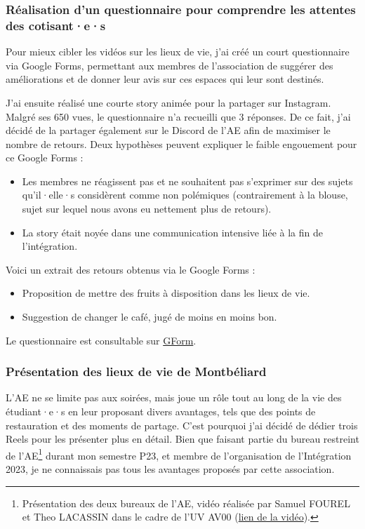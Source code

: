 \subsubsection{Réalisation d'un questionnaire pour comprendre les attentes des cotisant·e·s}

Pour mieux cibler les vidéos sur les lieux de vie, j'ai créé un court questionnaire via Google Forms, permettant aux membres de l'association de suggérer des améliorations et de donner leur avis sur ces espaces qui leur sont destinés.

J'ai ensuite réalisé une courte story animée pour la partager sur Instagram.
Malgré ses 650 vues, le questionnaire n'a recueilli que 3 réponses.
De ce fait, j'ai décidé de la partager également sur le Discord de l'\gls{AE} afin de maximiser le nombre de retours.
Deux hypothèses peuvent expliquer le faible engouement pour ce Google Forms :
\begin{itemize}
    \item Les membres ne réagissent pas et ne souhaitent pas s'exprimer sur des sujets qu'il·elle·s considèrent comme non polémiques (contrairement à la blouse, sujet sur lequel nous avons eu nettement plus de retours).
    \item La story était noyée dans une communication intensive liée à la fin de l'intégration.
\end{itemize}

Voici un extrait des retours obtenus via le Google Forms :
\begin{itemize}
    \item Proposition de mettre des fruits à disposition dans les lieux de vie.
    \item Suggestion de changer le café, jugé de moins en moins bon.
\end{itemize}


Le questionnaire est consultable sur \href{https://docs.google.com/forms/d/e/1FAIpQLSfOkOUDseCfWcLwP2uz_amd-i2v_5OucU92uZAUewR6VN_P_A/viewform?usp=sf_link}{GForm}.

\subsubsection{Présentation des lieux de vie de Montbéliard}\label{subsubsec:montbeliard}

L'\gls{AE} ne se limite pas aux soirées, mais joue un rôle tout au long de la vie des étudiant·e·s en leur proposant divers avantages, tels que des points de restauration et des moments de partage.
C'est pourquoi j'ai décidé de dédier trois Reels pour les présenter plus en détail.
Bien que faisant partie du bureau restreint de l'\gls{AE}\footnote{Présentation des deux bureaux de l'\gls{AE}, vidéo réalisée par Samuel FOUREL et Theo LACASSIN dans le cadre de l'UV AV00 (\href{https://www.instagram.com/reel/CeT9t0uAxrS/?utm_source=ig_web_copy_link&igshid=MzRlODBiNWFlZA==}{lien de la vidéo}).} durant mon semestre P23, et membre de l'organisation de l'Intégration 2023, je ne connaissais pas tous les avantages proposés par cette association.

